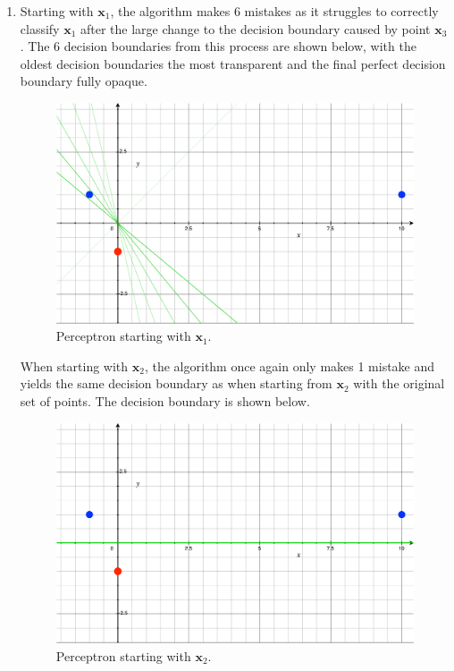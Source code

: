\documentclass{article}
\begin{document}
\begin{enumerate}
	\item Starting with $\mathbf{x}_1$, the algorithm makes 6 mistakes as it struggles to correctly classify $\mathbf{x}_1$ after the large change to the decision boundary caused by point $\mathbf{x}_3$. The 6 decision boundaries from this process are shown below, with the oldest decision boundaries the most transparent and the final perfect decision boundary fully opaque.
\begin{figure}[H]
	\centering
	\includegraphics[scale=0.4]{fig/b1.pdf}
	\caption{Perceptron starting with $\mathbf{x}_1$.}
\end{figure}

		When starting with $\mathbf{x}_2$, the algorithm once again only makes 1 mistake and yields the same decision boundary as when starting from $\mathbf{x}_2$ with the original set of points. The decision boundary is shown below.
		\begin{figure}[H]
			\centering
			\includegraphics[scale=0.4]{fig/b2.pdf}
			\caption{Perceptron starting with $\mathbf{x}_2$.}
		\end{figure}
		


\end{enumerate}
\end{document}
